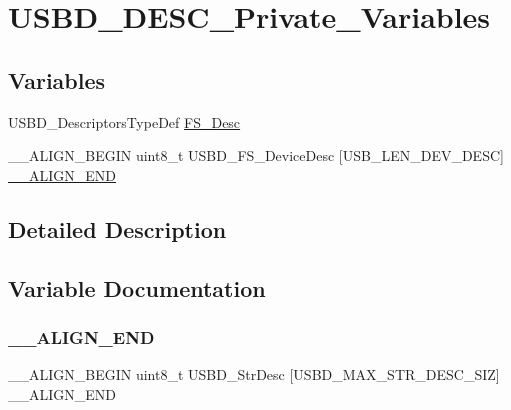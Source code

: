 \hypertarget{group___u_s_b_d___d_e_s_c___private___variables}{}\section{U\+S\+B\+D\+\_\+\+D\+E\+S\+C\+\_\+\+Private\+\_\+\+Variables}
\label{group___u_s_b_d___d_e_s_c___private___variables}
\subsection*{Variables}
\begin{DoxyCompactItemize}
\item 
U\+S\+B\+D\+\_\+\+Descriptors\+Type\+Def \hyperlink{group___u_s_b_d___d_e_s_c___private___variables_gae36d67393118d9d8531a8d633e23a797}{F\+S\+\_\+\+Desc}
\item 
\+\_\+\+\_\+\+A\+L\+I\+G\+N\+\_\+\+B\+E\+G\+IN uint8\+\_\+t U\+S\+B\+D\+\_\+\+F\+S\+\_\+\+Device\+Desc \mbox{[}U\+S\+B\+\_\+\+L\+E\+N\+\_\+\+D\+E\+V\+\_\+\+D\+E\+SC\mbox{]} \hyperlink{group___u_s_b_d___d_e_s_c___private___variables_ga89686ff64ce14e5466980830aea57e07}{\+\_\+\+\_\+\+A\+L\+I\+G\+N\+\_\+\+E\+ND}
\end{DoxyCompactItemize}


\subsection{Detailed Description}


\subsection{Variable Documentation}
\hypertarget{group___u_s_b_d___d_e_s_c___private___variables_ga89686ff64ce14e5466980830aea57e07}{}\label{group___u_s_b_d___d_e_s_c___private___variables_ga89686ff64ce14e5466980830aea57e07} 
\subsubsection{\texorpdfstring{\+\_\+\+\_\+\+A\+L\+I\+G\+N\+\_\+\+E\+ND}{\_\_ALIGN\_END}}
{\footnotesize\ttfamily \+\_\+\+\_\+\+A\+L\+I\+G\+N\+\_\+\+B\+E\+G\+IN uint8\+\_\+t U\+S\+B\+D\+\_\+\+Str\+Desc \mbox{[}U\+S\+B\+D\+\_\+\+M\+A\+X\+\_\+\+S\+T\+R\+\_\+\+D\+E\+S\+C\+\_\+\+S\+IZ\mbox{]} \+\_\+\+\_\+\+A\+L\+I\+G\+N\+\_\+\+E\+ND}

